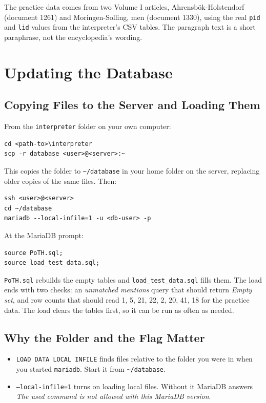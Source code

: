 \documentclass[11pt]{article}
\newcommand{\code}[1]{\texttt{#1}}
\begin{document}
The practice data comes from two Volume I articles, Ahrensbök-Holstendorf
(document 1261) and Moringen-Solling, men (document 1330), using the real
\code{pid} and \code{lid} values from the interpreter's CSV tables. The
paragraph text is a short paraphrase, not the encyclopedia's wording.

\section{Updating the Database}

\subsection{Copying Files to the Server and Loading Them}

From the \code{interpreter} folder on your own computer:

\begin{lstlisting}
cd <path-to>\interpreter
scp -r database <user>@<server>:~
\end{lstlisting}

This copies the folder to \code{\textasciitilde/database} in your home
folder on the server, replacing older copies of the same files. Then:

\begin{lstlisting}
ssh <user>@<server>
cd ~/database
mariadb --local-infile=1 -u <db-user> -p
\end{lstlisting}

At the MariaDB prompt:

\begin{lstlisting}
source PoTH.sql;
source load_test_data.sql;
\end{lstlisting}

\code{PoTH.sql} rebuilds the empty tables and \code{load\_test\_data.sql}
fills them. The load ends with two checks: an \textit{unmatched mentions}
query that should return \textit{Empty set}, and row counts that should
read 1, 5, 21, 22, 2, 20, 41, 18 for the practice data. The load clears
the tables first, so it can be run as often as needed.

\subsection{Why the Folder and the Flag Matter}

\begin{itemize}
  \item \code{LOAD DATA LOCAL INFILE} finds files relative to the folder
  you were in when you started \code{mariadb}. Start it from
  \code{\textasciitilde/database}.
  \item \code{--local-infile=1} turns on loading local files. Without it
  MariaDB answers \textit{The used command is not allowed with this
  MariaDB version}.
\end{itemize}
\end{document}
